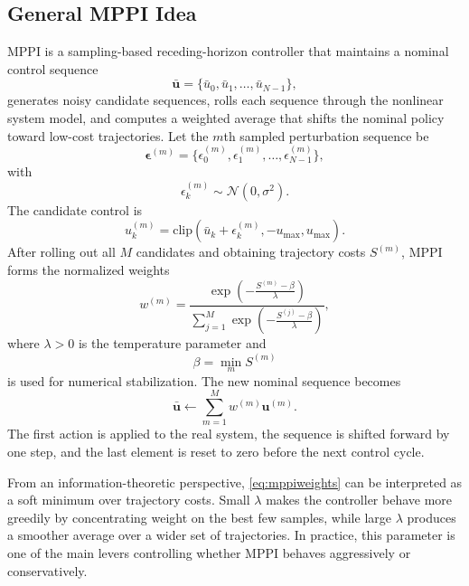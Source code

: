 \documentclass[conference]{IEEEtran}
\begin{document}
\subsection{General MPPI Idea}
MPPI is a sampling-based receding-horizon controller that maintains a nominal control sequence
\begin{equation}
\bar{\bm{u}} = \{\bar{u}_0,\bar{u}_1,\ldots,\bar{u}_{N-1}\},
\end{equation}
generates noisy candidate sequences, rolls each sequence through the nonlinear system model, and computes a weighted average that shifts the nominal policy toward low-cost trajectories. Let the $m$th sampled perturbation sequence be
\begin{equation}
\bm{\epsilon}^{(m)} = \{\epsilon_0^{(m)}, \epsilon_1^{(m)}, \ldots, \epsilon_{N-1}^{(m)}\},
\end{equation}
with
\begin{equation}
\epsilon_k^{(m)} \sim \mathcal{N}(0,\sigma^2).
\end{equation}
The candidate control is
\begin{equation}
u_k^{(m)} = \mathrm{clip}(\bar{u}_k + \epsilon_k^{(m)}, -u_{\max}, u_{\max}).
\end{equation}
After rolling out all $M$ candidates and obtaining trajectory costs $S^{(m)}$, MPPI forms the normalized weights
\begin{equation}
w^{(m)} = \frac{\exp\left(-\frac{S^{(m)}-\beta}{\lambda}\right)}
{\sum_{j=1}^{M}\exp\left(-\frac{S^{(j)}-\beta}{\lambda}\right)},
\label{eq:mppiweights}
\end{equation}
where $\lambda>0$ is the temperature parameter and
\begin{equation}
\beta = \min_m S^{(m)}
\end{equation}
is used for numerical stabilization. The new nominal sequence becomes
\begin{equation}
\bar{\bm{u}} \leftarrow \sum_{m=1}^{M} w^{(m)} \bm{u}^{(m)}.
\label{eq:mppiupdate}
\end{equation}
The first action is applied to the real system, the sequence is shifted forward by one step, and the last element is reset to zero before the next control cycle.

From an information-theoretic perspective, \eqref{eq:mppiweights} can be interpreted as a soft minimum over trajectory costs. Small $\lambda$ makes the controller behave more greedily by concentrating weight on the best few samples, while large $\lambda$ produces a smoother average over a wider set of trajectories. In practice, this parameter is one of the main levers controlling whether MPPI behaves aggressively or conservatively.
\end{document}
